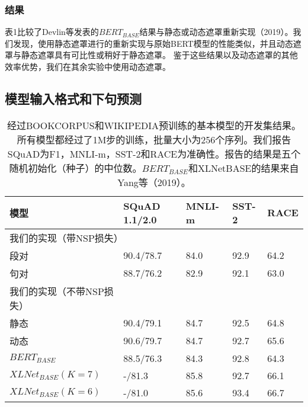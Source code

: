 \documentclass[lang=cn,11pt,a4paper,twocolumn]{elegantpaper}
\begin{document}
\subsubsection{结果}
表1比较了Devlin等发表的$BERT_{BASE}$结果与静态或动态遮罩重新实现（2019）。我们发现，使用静态遮罩进行的重新实现与原始BERT模型的性能类似，并且动态遮罩与静态遮罩具有可比性或稍好于静态遮罩。
鉴于这些结果以及动态遮罩的其他效率优势，我们在其余实验中使用动态遮罩。

\subsection{模型输入格式和下句预测}

\begin{table*}[]
  \centering
  \begin{tabular}{lllll}
  \hline
  模型               & \textbf{SQuAD 1.1/2.0} & \textbf{MNLI-m} & \textbf{SST-2} & \textbf{RACE} \\ \hline
  \multicolumn{5}{l}{我们的实现（带NSP损失）}                                                            \\
  段对               & 90.4/78.7              & 84.0            & 92.9           & 64.2          \\
  句对               & 88.7/76.2              & 82.9            & 92.1           & 63.0          \\ \hline
  我们的实现（不带NSP损失）   &                        &                 &                &               \\
  静态               & 90.4/79.1              & 84.7            & 92.5           & 64.8          \\
  动态               & 90.6/79.7              & 84.7            & 92.7           & 65.6          \\ \hline
  $BERT_{BASE}$         & 88.5/76.3              & 84.3            & 92.8           & 64.3          \\
  $XLNet_{BASE}(K = 7)$ & -/81.3                 & 85.8            & 92.7           & 66.1          \\
  $XLNet_{BASE}(K = 6)$ & -/81.0                 & 85.6            & 93.4           & 66.7          \\ \hline
  \end{tabular}
  \caption{经过BOOKCORPUS和WIKIPEDIA预训练的基本模型的开发集结果。所有模型都经过了1M步的训练，批量大小为256个序列。我们报告SQuAD为F1，MNLI-m，SST-2和RACE为准确性。报告的结果是五个随机初始化（种子）的中位数。$BERT_{BASE}$和XLNetBASE的结果来自Yang等（2019）。}
\end{table*}
\end{document}
